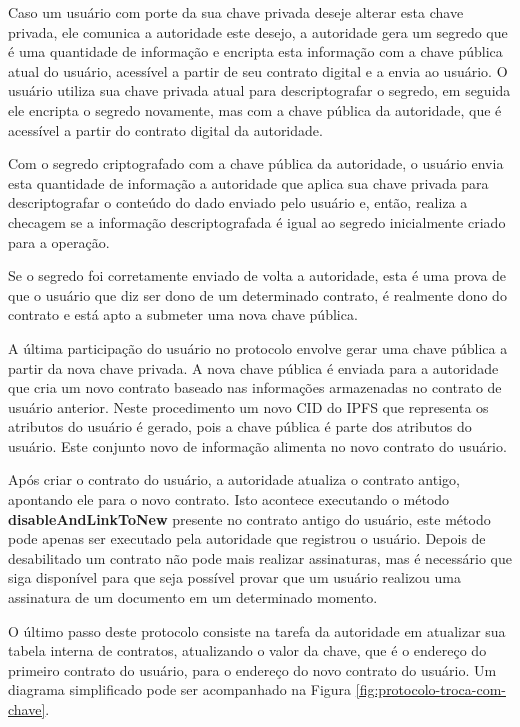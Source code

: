 \documentclass[tcc,capa]{texufpel}
\begin{document}
        Caso um usuário com porte da sua chave privada deseje alterar esta chave privada, ele comunica a autoridade este desejo, a autoridade gera um segredo que é uma quantidade de informação e encripta esta informação com a chave pública atual do usuário, acessível a partir de seu contrato digital e a envia ao usuário. O usuário utiliza sua chave privada atual para descriptografar o segredo, em seguida ele encripta o segredo novamente, mas com a chave pública da autoridade, que é acessível a partir do contrato digital da autoridade.
        
        Com o segredo criptografado com a chave pública da autoridade, o usuário envia esta quantidade de informação a autoridade que aplica sua chave privada para descriptografar o conteúdo do dado enviado pelo usuário e, então, realiza a checagem se a informação descriptografada é igual ao segredo inicialmente criado para a operação.
        
        Se o segredo foi corretamente enviado de volta a autoridade, esta é uma prova de que o usuário que diz ser dono de um determinado contrato, é realmente dono do contrato e está apto a submeter uma nova chave pública.
        
        A última participação do usuário no protocolo envolve gerar uma chave pública a partir da nova chave privada. A nova chave pública é enviada para a autoridade que cria um novo contrato baseado nas informações armazenadas no contrato de usuário anterior. Neste procedimento um novo CID do IPFS que representa os atributos do usuário é gerado, pois a chave pública é parte dos atributos do usuário. Este conjunto novo de informação alimenta no novo contrato do usuário.
        
        Após criar o contrato do usuário, a autoridade atualiza o contrato antigo, apontando ele para o novo contrato. Isto acontece executando o método \textbf{disableAndLinkToNew} presente no contrato antigo do usuário, este método pode apenas ser executado pela autoridade que registrou o usuário. Depois de desabilitado um contrato não pode mais realizar assinaturas, mas é necessário que siga disponível para que seja possível provar que um usuário realizou uma assinatura de um documento em um determinado momento.
        
        O último passo deste protocolo consiste na tarefa da autoridade em atualizar sua tabela interna de contratos, atualizando o valor da chave, que é o endereço do primeiro contrato do usuário, para o endereço do novo contrato do usuário. Um diagrama simplificado pode ser acompanhado na Figura \ref{fig:protocolo-troca-com-chave}.
        
\end{document}
